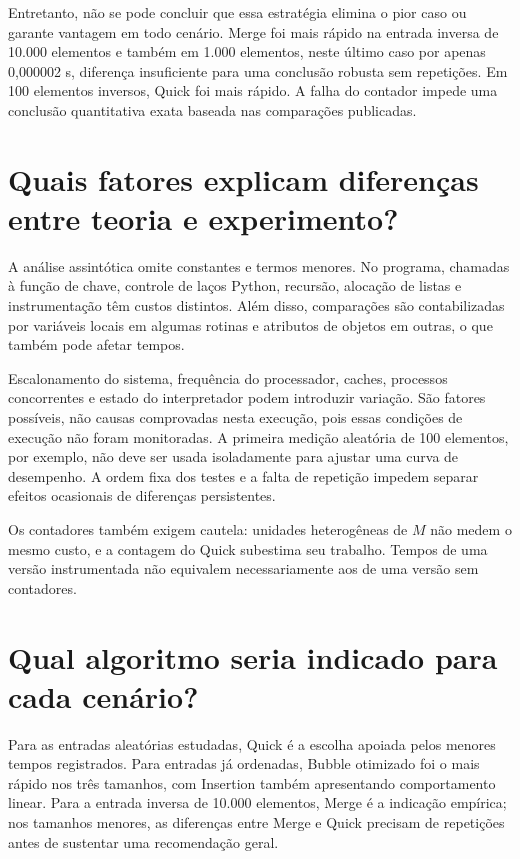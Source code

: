 \documentclass[12pt]{uftex}
\begin{document}
Entretanto, não se pode concluir que essa estratégia elimina o pior caso ou garante vantagem em todo cenário. Merge foi mais rápido na entrada inversa de 10.000 elementos e também em 1.000 elementos, neste último caso por apenas 0,000002 s, diferença insuficiente para uma conclusão robusta sem repetições. Em 100 elementos inversos, Quick foi mais rápido. A falha do contador impede uma conclusão quantitativa exata baseada nas comparações publicadas.

\section{Quais fatores explicam diferenças entre teoria e experimento?}
A análise assintótica omite constantes e termos menores. No programa, chamadas à função de chave, controle de laços Python, recursão, alocação de listas e instrumentação têm custos distintos. Além disso, comparações são contabilizadas por variáveis locais em algumas rotinas e atributos de objetos em outras, o que também pode afetar tempos.

Escalonamento do sistema, frequência do processador, caches, processos concorrentes e estado do interpretador podem introduzir variação. São fatores possíveis, não causas comprovadas nesta execução, pois essas condições de execução não foram monitoradas. A primeira medição aleatória de 100 elementos, por exemplo, não deve ser usada isoladamente para ajustar uma curva de desempenho. A ordem fixa dos testes e a falta de repetição impedem separar efeitos ocasionais de diferenças persistentes.

Os contadores também exigem cautela: unidades heterogêneas de $M$ não medem o mesmo custo, e a contagem do Quick subestima seu trabalho. Tempos de uma versão instrumentada não equivalem necessariamente aos de uma versão sem contadores.

\section{Qual algoritmo seria indicado para cada cenário?}
Para as entradas aleatórias estudadas, Quick é a escolha apoiada pelos menores tempos registrados. Para entradas já ordenadas, Bubble otimizado foi o mais rápido nos três tamanhos, com Insertion também apresentando comportamento linear. Para a entrada inversa de 10.000 elementos, Merge é a indicação empírica; nos tamanhos menores, as diferenças entre Merge e Quick precisam de repetições antes de sustentar uma recomendação geral.
\end{document}
